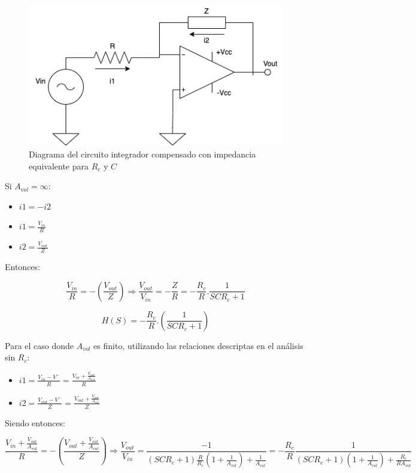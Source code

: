 \begin{figure}[H]
    \centering 
    \includegraphics [scale=0.7] {../Ejercicio3-CircuitoIntegradoresyDerivadores/Imagenes/diagrama-integrador-compensado-resumido.png} 
    \caption{Diagrama del circuito integrador compensado con impedancia equivalente para $R_c$ y $C$}
    \label{fig:emptyPlotTool}
\end{figure}

Si $A_{vol} = \infty$:

\begin{itemize}
	\item $i1 = -i2$
	\item $i1 = \frac{V_{in}}{R} $
	\item $i2 = \frac{V_{out}}{Z}$
\end{itemize}

Entonces:

$$ \frac{V_{in}}{R} = - (\frac{V_{out}}{Z}) \Longrightarrow \frac{V_{out}}{V_{in}} = -\frac{Z}{R} = - \frac{R_c}{R}.\frac{1}{SCR_c+1}$$

$$ H(S) = - \frac{R_c}{R}.(\frac{1}{SCR_c+1})$$

Para el caso donde $A_{vol}$ es finito, utilizando las relaciones descriptas en el análisis sin $R_c$:

\begin{itemize}
	\item $i1 = \frac {V_{in}-V^{-}}{R} =  \frac {V_{in} + \frac{V_{out}}{A_{vol}}}{R}$
	\item $i2 = \frac {V_{out}-V^{-}}{Z} = \frac {V_{out} + \frac{V_{out}}{A_{vol}}}{Z}$
\end{itemize}

Siendo entonces:

$$ \frac {V_{in} + \frac{V_{out}}{A_{vol}}}{R} = -(\frac {V_{out} + \frac{V_{out}}{A_{vol}}}{Z})
\Longrightarrow \frac{V_{out}}{V_{in}} = \frac{-1}{(SCR_c+1)\frac{R}{R_c}(1+\frac{1}{A_{vol}})+\frac{1}{A_{vol}}} = 
-\frac{R_c}{R}\frac{1}{(SCR_c+1)(1+\frac{1}{A_{vol}})+\frac{R_c}{RA_{vol}}} $$

